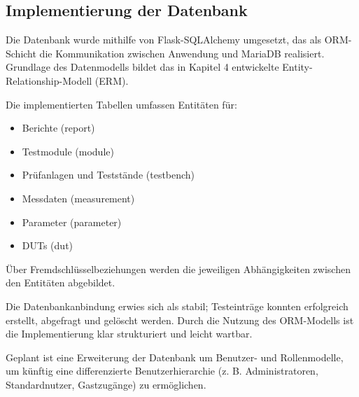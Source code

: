 \subsection{Implementierung der Datenbank}
\label{subsec:implementierung-der-datenbank}


Die Datenbank wurde mithilfe von Flask-SQLAlchemy umgesetzt, das als ORM-Schicht die Kommunikation zwischen Anwendung und MariaDB realisiert.
Grundlage des Datenmodells bildet das in Kapitel 4 entwickelte Entity-Relationship-Modell (ERM).


Die implementierten Tabellen umfassen Entitäten für:


\begin{itemize}

\item
Berichte (report)




\item
Testmodule (module)




\item
Prüfanlagen und Teststände (testbench)




\item
Messdaten (measurement)




\item
Parameter (parameter)




\item
DUTs (dut)




\end{itemize}

Über Fremdschlüsselbeziehungen werden die jeweiligen Abhängigkeiten zwischen den Entitäten abgebildet.

Die Datenbankanbindung erwies sich als stabil; Testeinträge konnten erfolgreich erstellt, abgefragt und gelöscht werden. Durch die Nutzung des ORM-Modells ist die Implementierung klar strukturiert und leicht wartbar.


Geplant ist eine Erweiterung der Datenbank um Benutzer- und Rollenmodelle, um künftig eine differenzierte Benutzerhierarchie (z. B. Administratoren, Standardnutzer, Gastzugänge) zu ermöglichen.


